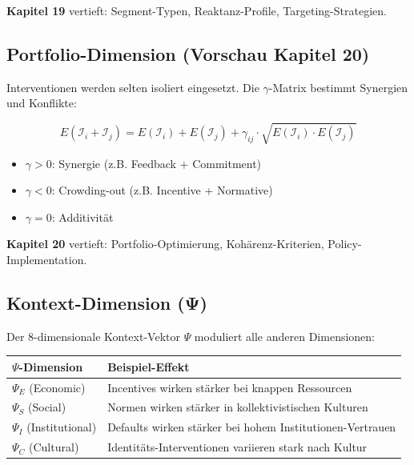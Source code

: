 \textbf{Kapitel 19} vertieft: Segment-Typen, Reaktanz-Profile, Targeting-Strategien.


\subsection{Portfolio-Dimension (Vorschau Kapitel 20)}

Interventionen werden selten isoliert eingesetzt. Die $\gamma$-Matrix bestimmt Synergien und Konflikte:

\begin{equation}
E(\mathcal{I}_i + \mathcal{I}_j) = E(\mathcal{I}_i) + E(\mathcal{I}_j) + \gamma_{ij} \cdot \sqrt{E(\mathcal{I}_i) \cdot E(\mathcal{I}_j)}
\end{equation}

\begin{itemize}[nosep]
\item $\gamma > 0$: Synergie (z.B. Feedback + Commitment)
\item $\gamma < 0$: Crowding-out (z.B. Incentive + Normative)
\item $\gamma = 0$: Additivität
\end{itemize}

\textbf{Kapitel 20} vertieft: Portfolio-Optimierung, Kohärenz-Kriterien, Policy-Implementation.


\subsection{Kontext-Dimension (Ψ)}

Der 8-dimensionale Kontext-Vektor $\Psi$ moduliert alle anderen Dimensionen:

\begin{center}
\begin{tabular}{@{}ll@{}}
\toprule
\textbf{$\Psi$-Dimension} & \textbf{Beispiel-Effekt} \\
\midrule
$\Psi_E$ (Economic) & Incentives wirken stärker bei knappen Ressourcen \\
$\Psi_S$ (Social) & Normen wirken stärker in kollektivistischen Kulturen \\
$\Psi_I$ (Institutional) & Defaults wirken stärker bei hohem Institutionen-Vertrauen \\
$\Psi_C$ (Cultural) & Identitäts-Interventionen variieren stark nach Kultur \\
\bottomrule
\end{tabular}
\end{center}

